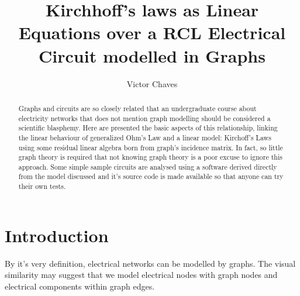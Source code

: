 \documentclass{comjnl}
\begin{document}
\title[Kirchhoff's laws as Linear Equations over a RCL Electrical Circuit modelled in Graphs]{Kirchhoff's laws as Linear Equations over a RCL Electrical Circuit modelled in Graphs}
\author{Victor Chaves}
 






\begin{abstract}
Graphs and circuits are so closely related that an undergraduate course about electricity networks that does not mention graph modelling should be considered a scientific blasphemy. Here are presented the basic aspects of this relationship, linking the linear behaviour of generalized Ohm's Law and a linear model: Kirchoff's Laws using some residual linear algebra born from graph's incidence matrix. In fact, so little graph theory is required that not knowing graph theory is a poor excuse to ignore this approach. Some simple sample circuits are analysed using a software derived directly from the model discussed and it's source code is made available so that anyone can try their own tests.
\end{abstract}

\maketitle


\section{Introduction}
\label{Sec:Intro}

By it's very definition, electrical networks can be modelled by graphs. The visual similarity may suggest that we model electrical nodes with graph nodes and electrical components within graph edges.

\end{document}
